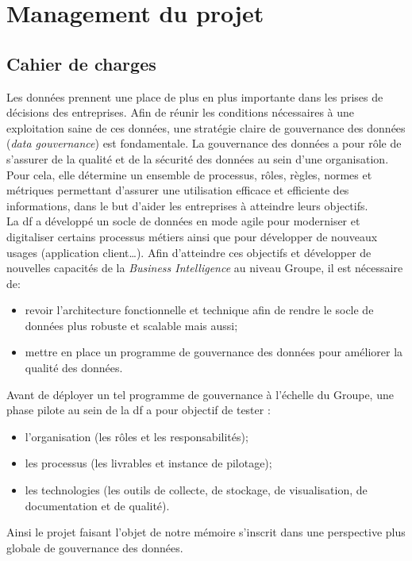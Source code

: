 \section{Management du projet}


\subsection{Cahier de charges}
Les données prennent une place de plus en plus importante dans les prises de décisions des entreprises. Afin de réunir les conditions nécessaires à une exploitation saine de ces données, une strat\'egie claire de gouvernance des donn\'ees (\textit{data gouvernance}) est fondamentale. La gouvernance des donn\'ees a pour rôle de s’assurer de la qualité et de la sécurité des données au sein d’une organisation. Pour cela, elle détermine un ensemble de processus, rôles, règles, normes et métriques permettant d’assurer une utilisation efficace et efficiente des informations, dans le but d’aider les entreprises à atteindre leurs objectifs.\\


La \acrlong{df} a développé un socle de données en mode agile pour moderniser et digitaliser certains processus métiers ainsi que pour développer de nouveaux usages (application client…). Afin d'atteindre ces objectifs et d\'evelopper de nouvelles capacités de la \textit{Business Intelligence} au niveau Groupe, il est nécessaire de:
\begin{itemize}[parsep=0cm,itemsep=0cm]
\item revoir l’architecture fonctionnelle et technique afin de rendre le socle de donn\'ees plus robuste et scalable mais aussi;
\item mettre en place un programme de gouvernance des données pour améliorer la qualité des données.
\end{itemize}

Avant de d\'eployer un tel programme de gouvernance à l’échelle du Groupe, une phase pilote au sein de la \acrshort{df} a pour objectif de tester :
\begin{itemize}[parsep=0cm,itemsep=0cm]
\item l'organisation (les rôles et les responsabilités);
\item les processus (les livrables et instance de pilotage);
\item les technologies (les outils de collecte, de stockage, de visualisation, de documentation et de qualit\'e).
\end{itemize}
Ainsi le projet faisant l'objet de notre m\'emoire s'inscrit dans une perspective plus globale de gouvernance des donn\'ees.

